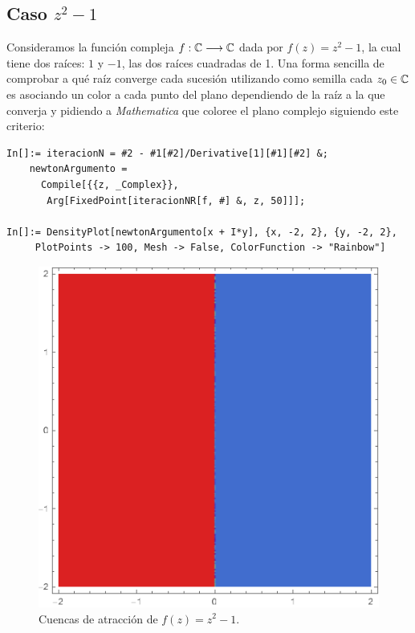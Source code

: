 \subsection{Caso $z^2-1$}

Consideramos la función compleja $f:\mathbb{C}\longrightarrow\mathbb{C}$ dada por $f(z)=z^2-1$, la cual tiene dos raíces: $1$ y $-1$, las dos raíces cuadradas de 1. Una forma sencilla de comprobar a qué raíz converge cada sucesión utilizando como semilla cada $z_0\in\mathbb{C}$ es asociando un color a cada punto del plano dependiendo de la raíz a la que converja y pidiendo a \textit{Mathematica} que coloree el plano complejo siguiendo este criterio:

\begin{verbatim}
In[]:= iteracionN = #2 - #1[#2]/Derivative[1][#1][#2] &;
    newtonArgumento = 
      Compile[{{z, _Complex}}, 
       Arg[FixedPoint[iteracionNR[f, #] &, z, 50]]];
    
In[]:= DensityPlot[newtonArgumento[x + I*y], {x, -2, 2}, {y, -2, 2}, 
     PlotPoints -> 100, Mesh -> False, ColorFunction -> "Rainbow"] 
\end{verbatim}

\begin{figure} [h]
\centering
\includegraphics[scale = 0.4]{img/cuencas-1.png}
\caption{Cuencas de atracción de $f(z)=z^2-1$.}
    \label{fig:cuencas-1}
\end{figure}

